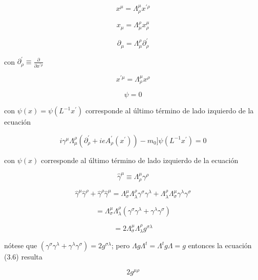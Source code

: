 \documentclass{report}
\begin{document}
\[x^{\mu} = \Lambda_{\rho}^{\mu} x^{\prime \rho}\]

\[x_{\mu} = \Lambda_{\mu}^{\rho} x_{\rho}^{\mu}\]

\begin{equation}
\partial_{\mu} = \Lambda_{\mu}^{\rho} \partial_{\rho}^{\prime}
\end{equation}

con $\partial_{\rho}^{\prime} \equiv \frac{\partial}{\partial x^{\prime \rho}}$

\begin{equation}
x^{\prime \mu} = \Lambda_{\rho}^{\mu} x^{\rho}
\end{equation}

\begin{equation}
[i \gamma^{\mu} (\Lambda_{\mu}^{\rho} \partial_{\rho}^{\prime} + ie \Lambda_{\mu}^{\rho} A_{\rho}^{\prime}(x^{\prime}))-m_0]\psi = 0
\end{equation}


con $\psi (x) = \psi (L^{-1} x^{\prime})$ corresponde al último término de lado izquierdo de la ecuación

\begin{equation}
i \gamma^{\mu} \Lambda_{\mu}^{\rho} (\partial_{\rho}^{\prime} + ieA_{\rho}^{\prime} (x^{\prime}))-m_0] \psi (L^{-1}x^{\prime})=0
\end{equation}


con $\psi(x)$ corresponde al último término de lado izquierdo de la ecuación

\[\hat{\gamma}^{\mu} \equiv \Lambda_{\rho}^{\mu} \gamma^{\rho}\]

\[\hat{\gamma}^{\mu} \hat{\gamma}^{\rho} + \hat{\gamma}^{\rho} \hat{\gamma}^{\mu} = \Lambda_{\sigma}^{\mu} \Lambda_{\lambda}^{\rho} \gamma^{\sigma} \gamma^{\lambda} + \Lambda_{\lambda}^{\rho}\Lambda_{\sigma}^{\mu}\gamma^{\lambda}\gamma^{\sigma}\]

\[= \Lambda_{\sigma}^{\mu} \Lambda_{\lambda}^{\rho} (\gamma^{\sigma} \gamma^{\lambda} + \gamma^{\lambda} \gamma^{\sigma})\]

\begin{equation}
= 2 \Lambda_{\sigma}^{\mu} \Lambda_{\lambda}^{\rho} g^{\sigma \lambda}
\end{equation}

nótese que $(\gamma^{\sigma} \gamma^{\lambda} + \gamma^{\lambda} \gamma^{\sigma}) = 2g^{\sigma \lambda}$; pero $ \Lambda g \Lambda^{t} = \Lambda^{t} g \Lambda = g$ entonces la ecuación (3.6) resulta

\begin{equation}
2 g^{\mu \rho}
\end{equation}
\end{document}
